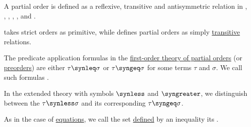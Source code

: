 \begin{comments}
  \item A partial order is defined as a reflexive, transitive and antisymmetric relation in
  \cite[4]{Engelking1989GeneralTopology},
  \cite[2]{DaveyPriestley2002LatticeTheory},
  \cite[13]{Harzheim2005OrderedSets},
  \cite[1]{Grätzer2011LatticeTheory},
  \cite[1]{Birkhoff1967LatticeTheory},
  \cite[72]{Гуров2013ТеорияРешёток} and
  \cite[10]{Проданов1982ФункционаленАнализЧаст1}.

  \Textcite[62]{Enderton1977SetTheory} takes strict orders as primitive, while \textcite[13]{Kelley1975GeneralTopology} defines partial orders as simply \hyperref[def:binary_relation/transitive]{transitive} relations.
\end{comments}

\begin{definition}\label{def:inequality}\mimprovised
  The predicate application formulas in the \hyperref[def:partially_ordered_set/theory]{first-order theory of partial orders} (or \hyperref[def:preordered_set]{preorders}) are either \( \tau \synleq \sigma \) or \( \tau \syngeq \sigma \) for some terms \( \tau \) and \( \sigma \). We call such formulas .

  In the extended theory with symbols \( \synless \) and \( \syngreater \), we distinguish between the  \( \tau \synless \sigma \) and its corresponding  \( \tau \syngeq \sigma \).

  \begin{thmenum}
     As in the case of \hyperref[def:fol_equation]{equations}, we call the set \hyperref[def:fol_definability]{defined} by an inequality its .
  \end{thmenum}
\end{definition}

